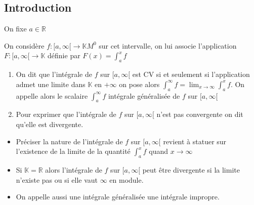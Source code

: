 \documentclass[11pt,hidelinks]{book}
\theoremstyle{mytheoremstyle}
\theoremstyle{mytheoremstyle}
\theoremstyle{mytheoremstyle}
\theoremstyle{mytheoremstyle}
\theoremstyle{mytheoremstyle}
\theoremstyle{mytheoremstyle}
\theoremstyle{mytheoremstyle}
\theoremstyle{mytheoremstyle}
\theoremstyle{myproblemstyle}
\def\mbb#1{\mathbb{#1}}
\def\bR{\mbb{R}}
\def\bK{\mbb{K}}
\def\af{[a,\infty[}
\newcommand{\func}[3]{#1\colon#2\to#3}
\begin{document}
\subsection{Introduction} On fixe $a \in \bR$
\begin{definition}
    On considère $\func{f}{[a,\infty[}{\bK} M^0$ sur cet intervalle, on 
    lui associe l'application $\func{F}{\af}{\bK}$ définie par $F(x) = \int_a^x f$ 
    \begin{enumerate} 
    \item On dit que l'intégrale de $f$ sur $\af$ est CV si et seulement si
    l'application admet une limite dans $\bK$ en $+\infty$ on pose alors 
    $\int_a^{\infty} f = \lim_{x \to \infty} \int_a^x f$. On appelle alors le scalaire $\int_a^{\infty} f$ 
    intégrale généralisée de $f$ sur $\af$ 

    \item Pour exprimer que l'intégrale de $f$ sur $\af$ n'est pas convergente on 
    dit qu'elle est divergente.
    \end{enumerate}
\end{definition}
\begin{rmq}
    \begin{itemize}
        \item Préciser la nature de l'intégrale de $f$ sur $\af$ revient 
        à statuer sur l'existence de la limite de la quantité $\int_a^x f$ quand $x \to \infty$
        \item Si $\bK = \bR$ alors l'intégrale de $f$ sur $\af$ peut être divergente si la limite 
        n'existe pas ou si elle vaut $\infty$ en module.
        \item On appelle aussi une intégrale généralisée une intégrale impropre.
    \end{itemize}
\end{rmq}
\end{document}
